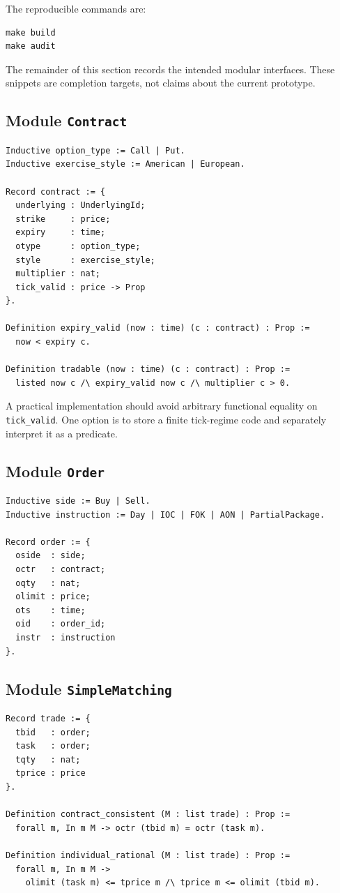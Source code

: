 \documentclass[11pt]{article}
\begin{document}
The reproducible commands are:
\begin{lstlisting}
make build
make audit
\end{lstlisting}

The remainder of this section records the intended modular interfaces. These snippets are completion targets, not claims about the current prototype.

\subsection{Module \texttt{Contract}}

\begin{lstlisting}
Inductive option_type := Call | Put.
Inductive exercise_style := American | European.

Record contract := {
  underlying : UnderlyingId;
  strike     : price;
  expiry     : time;
  otype      : option_type;
  style      : exercise_style;
  multiplier : nat;
  tick_valid : price -> Prop
}.

Definition expiry_valid (now : time) (c : contract) : Prop :=
  now < expiry c.

Definition tradable (now : time) (c : contract) : Prop :=
  listed now c /\ expiry_valid now c /\ multiplier c > 0.
\end{lstlisting}

A practical implementation should avoid arbitrary functional equality on \texttt{tick\_valid}. One option is to store a finite tick-regime code and separately interpret it as a predicate.

\subsection{Module \texttt{Order}}

\begin{lstlisting}
Inductive side := Buy | Sell.
Inductive instruction := Day | IOC | FOK | AON | PartialPackage.

Record order := {
  oside  : side;
  octr   : contract;
  oqty   : nat;
  olimit : price;
  ots    : time;
  oid    : order_id;
  instr  : instruction
}.
\end{lstlisting}

\subsection{Module \texttt{SimpleMatching}}

\begin{lstlisting}
Record trade := {
  tbid   : order;
  task   : order;
  tqty   : nat;
  tprice : price
}.

Definition contract_consistent (M : list trade) : Prop :=
  forall m, In m M -> octr (tbid m) = octr (task m).

Definition individual_rational (M : list trade) : Prop :=
  forall m, In m M ->
    olimit (task m) <= tprice m /\ tprice m <= olimit (tbid m).
\end{lstlisting}
\end{document}
